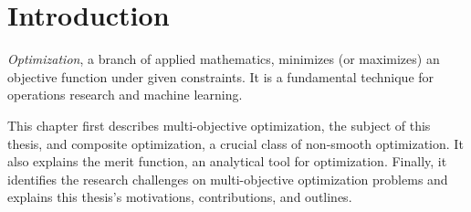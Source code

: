 \documentclass[../main]{subfiles}
\begin{document}
\chapter{Introduction} \label{sec:intro}
\emph{Optimization}, a branch of applied mathematics, minimizes (or maximizes) an objective function under given constraints.
It is a fundamental technique for operations research and machine learning.

This chapter first describes multi-objective optimization, the subject of this thesis, and composite optimization, a crucial class of non-smooth optimization.
It also explains the merit function, an analytical tool for optimization.
Finally, it identifies the research challenges on multi-objective optimization problems and explains this thesis's motivations, contributions, and outlines.










\end{document}
